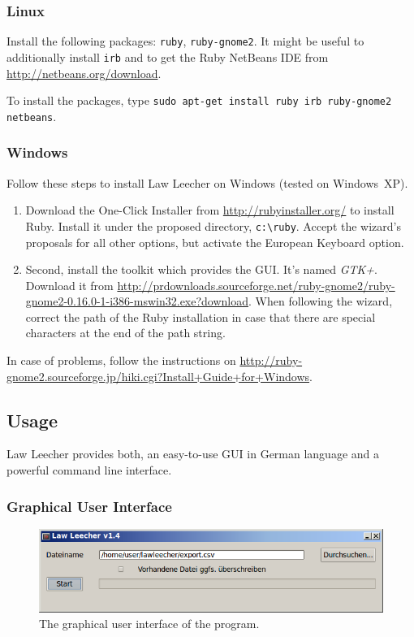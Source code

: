 \documentclass{scrartcl}
\begin{document}
\subsubsection{Linux}
Install the following packages: \texttt{ruby}, \texttt{ruby-gnome2}. It might be useful to additionally install \texttt{irb} and to get the Ruby NetBeans IDE from \url{http://netbeans.org/download}.

To install the packages, type \texttt{sudo apt-get install ruby irb ruby-gnome2 netbeans}.

\subsubsection{Windows}
Follow these steps to install Law Leecher on Windows (tested on Windows~XP).

\begin{enumerate}
\item Download the One-Click Installer from \url{http://rubyinstaller.org/} to install Ruby. Install it under the proposed directory, \texttt{c:\textbackslash ruby}. Accept the wizard's proposals for all other options, but activate the European Keyboard option.

\item Second, install the toolkit which provides the GUI. It's named \textit{GTK+}. Download it from \url{http://prdownloads.sourceforge.net/ruby-gnome2/ruby-gnome2-0.16.0-1-i386-mswin32.exe?download}. When following the wizard, correct the path of the Ruby installation in case that there are special characters at the end of the path string. 
\end{enumerate}
In case of problems, follow the instructions on \url{http://ruby-gnome2.sourceforge.jp/hiki.cgi?Install+Guide+for+Windows}.


\subsection{Usage}
Law Leecher provides both, an easy-to-use GUI in German language and a powerful command line interface.

\subsubsection{Graphical User Interface}
\begin{figure}[ht]
\begin{center}
\includegraphics[width = 0.92 \textwidth]{GUI.png}
\caption{The graphical user interface of the program.}
\label{fig:guiwindow}
\end{center}
\end{figure}
\end{document}
